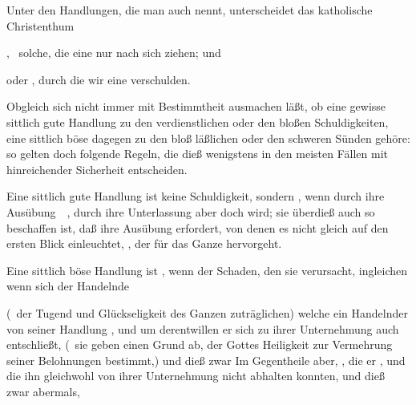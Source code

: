 \begin{aufza}
\begin{aufzb}
\begin{aufzc}
\end{aufzc}
\item Unter den  Handlungen, die man auch  nennt, unterscheidet das katholische Christenthum
\begin{aufzc}
\item {}, \dh\ solche, die eine nur  nach sich ziehen; und 
\item {} oder , durch die wir eine  verschulden.
\end{aufzc}
\end{aufzb}
\item Obgleich sich nicht immer mit Bestimmtheit ausmachen läßt, ob eine gewisse sittlich gute Handlung zu den verdienstlichen oder den bloßen Schuldigkeiten, eine sittlich böse dagegen zu den bloß läßlichen oder den schweren Sünden gehöre: so gelten doch folgende Regeln, die dieß wenigstens in den meisten Fällen mit hinreichender Sicherheit entscheiden.
\begin{aufzb}
\item Eine sittlich gute Handlung ist keine Schuldigkeit, sondern , wenn durch ihre Ausübung~\ , durch ihre Unterlassung aber doch  wird; sie überdieß auch so beschaffen ist, daß ihre Ausübung  erfordert, von denen es nicht gleich auf den ersten Blick einleuchtet, , der für das Ganze hervorgeht.
\item Eine sittlich böse Handlung ist , wenn der Schaden, den sie verursacht,  ingleichen wenn sich der Handelnde 
\end{aufzb}
\item {} (\dh\ der Tugend und Glückseligkeit des Ganzen zuträglichen)  welche ein Handelnder von seiner Handlung , und um derentwillen er sich zu ihrer Unternehmung auch entschließt,  (\dh\ sie geben einen Grund ab, der Gottes Heiligkeit zur Vermehrung seiner Belohnungen bestimmt,) und dieß zwar  Im Gegentheile aber, , die er , und die ihn gleichwohl von ihrer Unternehmung nicht abhalten konnten,  und dieß zwar abermals, 

\end{aufza}
